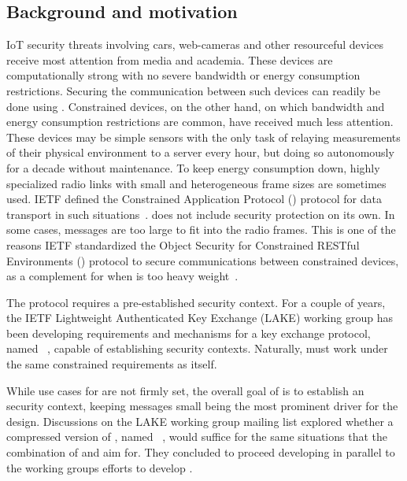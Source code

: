 \documentclass[runningheads,draft,x11names]{llncs}
\begin{document}
\subsection{Background and motivation}
\label{sec:motivation}
IoT security threats involving cars, web-cameras and other resourceful devices
receive most attention from media and academia.
%
These devices are computationally strong with no severe bandwidth or energy
consumption restrictions.
%
Securing the communication between such devices can readily be done using
\mDandTls.
%
Constrained devices, on the other hand, on which bandwidth and
energy consumption restrictions are common, have received much less attention.
%
These devices may be simple sensors with the only task of relaying
measurements of their physical environment to a server every hour, but doing so
autonomously for a decade without maintenance.
%
To keep energy consumption down, highly specialized radio links with small
and heterogeneous frame sizes are sometimes used.
%
IETF defined the Constrained Application Protocol (\mCoap{}) protocol for data
transport in such situations~\cite{rfc7252}.
%
\mCoap{} does not include security protection on its own.
%
In some cases, \mDandTls{} messages are too large to fit into the radio frames.
%
This is one of the reasons IETF standardized the Object Security for
Constrained RESTful Environments (\mOscore{}) protocol to secure
communications between constrained devices, as a complement for when
\mDandTls{} is too heavy weight~\cite{rfc8613}.
%

The \mOscore{} protocol requires a pre-established security context.
%
For a couple of years, the IETF Lightweight Authenticated Key Exchange (LAKE)
working group has been developing requirements and mechanisms for a key
exchange protocol, named \mEdhoc~\cite{selander-lake-edhoc-01}, capable of
establishing \mOscore{} security contexts.
%
Naturally, \mEdhoc{} must work under the same constrained requirements as
\mOscore{} itself.
%

While use cases for \mEdhoc{} are not firmly set,
the overall goal of \mEdhoc{} is to establish an \mOscore{} security
context, keeping messages small being the most prominent driver for the
design.
%
Discussions on the LAKE working group mailing list explored whether a
compressed version of \mTls, named \mCtls~\cite{ietf-tls-ctls-00}, would suffice
for the same situations that
the combination of \mOscore{} and \mEdhoc{} aim for.
%
They concluded to proceed developing \mEdhoc{} in parallel to the \mTls{}
working groups efforts to develop \mCtls.
%
\end{document}
